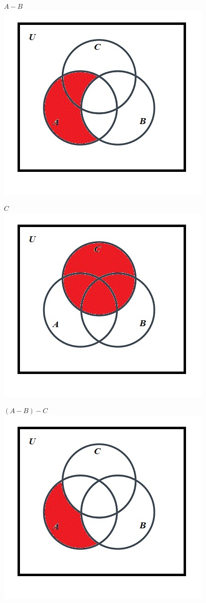 \documentclass[10pt]{article}
\begin{document}
$A - B$\\
\includegraphics[scale=0.55]{15}

$C$\\
\includegraphics[scale=0.55]{14}

$(A - B) - C$\\
\includegraphics[scale=0.55]{16}
\end{document}

